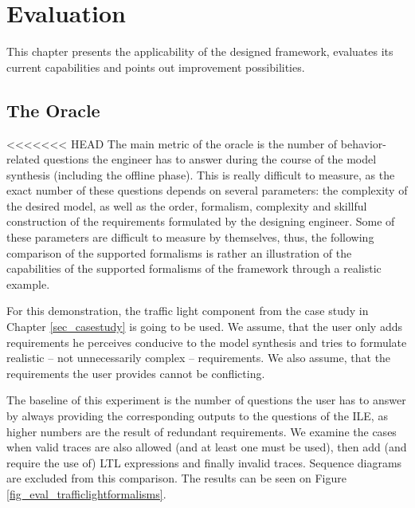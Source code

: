 \chapter{Evaluation}
This chapter presents the applicability of the designed framework, evaluates its current capabilities and points out improvement possibilities.

\section{The Oracle} \label{subs_evaloracle}
<<<<<<< HEAD
The main metric of the oracle is the number of behavior-related questions the engineer has to answer during the course of the model synthesis (including the offline phase). This is really difficult to measure, as the exact number of these questions depends on several parameters: the complexity of the desired model, as well as the order, formalism, complexity and skillful construction of the requirements formulated by the designing engineer. Some of these parameters are difficult to measure by themselves, thus, the following comparison of the supported formalisms is rather an illustration of the capabilities of the supported formalisms of the framework through a realistic example. 

For this demonstration, the traffic light component from the case study in Chapter \ref{sec_casestudy} is going to be used. We assume, that the user only adds requirements he perceives conducive to the model synthesis and tries to formulate realistic -- not unnecessarily complex -- requirements. We also assume, that the requirements the user provides cannot be conflicting.

The baseline of this experiment is the number of questions the user has to answer by always providing the corresponding outputs to the questions of the ILE, as higher numbers are the result of redundant requirements. We examine the cases when valid traces are also allowed (and at least one must be used), then add (and require the use of) LTL expressions and finally invalid traces. Sequence diagrams are excluded from this comparison. The results can be seen on Figure \ref{fig_eval_trafficlightformalisms}.


